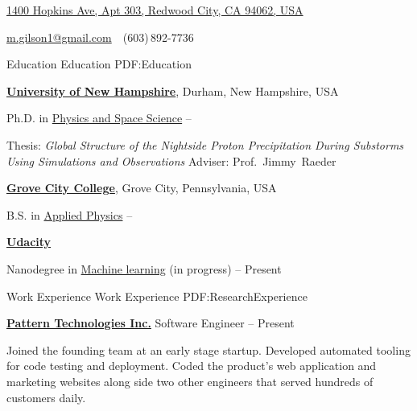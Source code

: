 \documentclass[letterpaper,MMMyyyy,nonstopmode]{simpleresumecv}
\newcommand{\CVAuthor}{Matthew Gilson, Ph.D}
\begin{document}

\Title{\CVAuthor}

\begin{SubTitle}
\href{https://www.google.com/maps/place/1400+Hopkins+Avenue,+Redwood+City,+California+994062,+USA}
{1400 Hopkins Ave, Apt 303, Redwood City, CA 94062, USA}
\par
\href{mailto:m.gilson1@gmail.com}
{m.gilson1@gmail.com}
\,\SubBulletSymbol\,
(603)\,892-7736
\end{SubTitle}

\begin{Body}


\Section
{Education}
{Education}
{PDF:Education}

\Entry
\href{http://www.unh.edu/}
{\textbf{University of New Hampshire}},
Durham, New Hampshire, USA

\Gap
\BulletItem
Ph.D. in
\href{http://physics.unh.edu/content/physics-phd}
{Physics and Space Science}
\hfill
{} --
\begin{Detail}
\SubBulletItem
Thesis: \textit{Global Structure of the Nightside Proton Precipitation During Substorms Using Simulations and Observations}
\SubBulletItem
Adviser:
Prof.~Jimmy~Raeder
\end{Detail}

\BigGap
\Entry
\href{http://www.gcc.edu/Pages/Grove-City-College.aspx}
{\textbf{Grove City College}},
Grove City, Pennsylvania, USA

\Gap
\BulletItem
B.S. in
\href{http://www.gcc.edu/academics/SEM/physics/Pages/default.aspx}
{Applied Physics}
\hfill
{} -- 

\BigGap
\Entry
\href{https://www.udacity.com}
{\textbf{Udacity}}

\Gap
\BulletItem
Nanodegree in
\href{https://www.udacity.com/course/machine-learning-engineer-nanodegree--nd009}
{Machine learning} (in progress)
\hfill
{} -- Present



\Section
{Work Experience}
{Work Experience}
{PDF:ResearchExperience}

\Entry
\href {https://getpattern.com}{\textbf{Pattern Technologies Inc.}}
\Gap
\BulletItem
Software Engineer
\hfill
{} -- Present
\begin{Detail}
\SubBulletItem
Joined the founding team at an early stage startup.  Developed automated tooling
for code testing and deployment.  Coded the product's web application and
marketing websites along side two other engineers that served hundreds of customers daily.
\end{Detail}


\end{Body}
\end{document}
